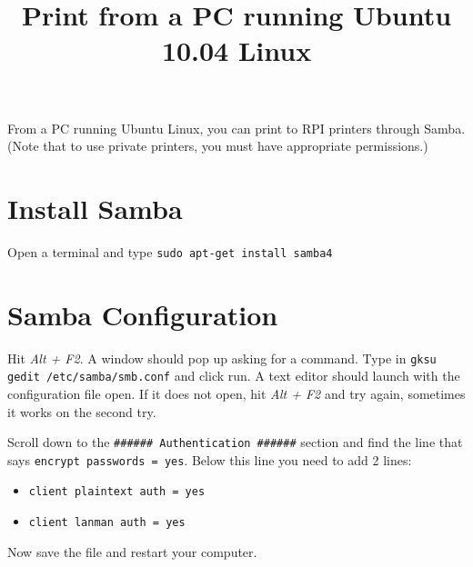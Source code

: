\documentclass[12pt, letter]{article}
\title{Print from a PC running Ubuntu 10.04 Linux}
\date{}
\author{}
\begin{document}
\maketitle
From a PC running Ubuntu Linux, you can print to RPI printers through Samba. (Note that to use private printers, you must have appropriate permissions.)
\section{Install Samba}
Open a terminal and type \texttt{sudo apt-get install samba4}
\section{Samba Configuration}
Hit \emph{Alt + F2}. A window should pop up asking for a command. Type in \texttt{gksu gedit /etc/samba/smb.conf} and click run. A text editor should launch with the configuration file open. If it does not open, hit \emph{Alt + F2} and try again, sometimes it works on the second try. 

Scroll down to the \texttt{\#\#\#\#\#\# Authentication \#\#\#\#\#\#} section and find the line that says \texttt{encrypt passwords = yes}. Below this line you need to add 2 lines: 
\begin{itemize}
\item \texttt{client plaintext auth = yes}
\item \texttt{client lanman auth = yes}
\end{itemize}
Now save the file and restart your computer.
\end{document}
